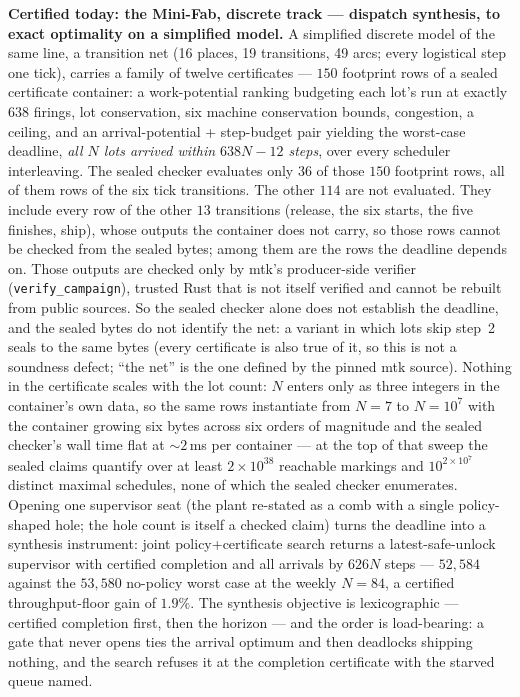 \textbf{Certified today: the Mini-Fab, discrete track --- dispatch
synthesis, to exact optimality on a simplified model.} A simplified
discrete model of the same line, a transition net (16 places, 19 transitions, 49 arcs; every logistical
step one tick), carries a family of twelve certificates --- $150$
footprint rows of a sealed certificate container: a work-potential
ranking budgeting each lot's run at exactly $638$ firings, lot
conservation, six machine conservation bounds, congestion, a
ceiling, and an arrival-potential + step-budget pair yielding the
worst-case deadline, \emph{all $N$ lots arrived within $638N - 12$
steps}, over every scheduler interleaving. The sealed checker
evaluates only $36$ of those $150$ footprint rows, all of them rows
of the six tick transitions. The other $114$ are not evaluated. They
include every row of the other $13$ transitions (release, the six
starts, the five finishes, ship), whose outputs the container does
not carry, so those rows cannot be checked from the sealed bytes;
among them are the rows the deadline depends on.
Those outputs are checked only by mtk's producer-side verifier
(\texttt{verify\_campaign}), trusted Rust that is not itself verified
and cannot be rebuilt from public sources. So the sealed checker
alone does not establish the deadline, and the sealed bytes do not
identify the net: a variant in which lots skip step~2 seals to the
same bytes (every certificate is also true of it, so this is not a
soundness defect; ``the net'' is the one defined by the pinned mtk
source). Nothing in the
certificate scales with the lot count: $N$ enters only as three
integers in the container's own data, so the same rows instantiate
from $N = 7$ to $N = 10^{7}$ with the container growing six bytes
across six orders of magnitude and the sealed checker's wall time flat at
$\sim\!2$\,ms per container --- at the top of that sweep the sealed claims
quantify over at least $2\times10^{38}$ reachable markings and
$10^{2\times10^{7}}$ distinct maximal schedules, none of which the sealed
checker enumerates. Opening one supervisor seat (the plant re-stated as
a comb with a single policy-shaped hole; the hole count is itself a
checked claim) turns the deadline into a synthesis instrument: joint
policy+certificate search returns a latest-safe-unlock supervisor
with certified completion and all arrivals by $626N$ steps ---
$52{,}584$ against the $53{,}580$ no-policy worst case at the weekly
$N = 84$, a certified throughput-floor gain of $1.9\%$. The
synthesis objective is lexicographic --- certified completion first,
then the horizon --- and the order is load-bearing: a gate that
never opens ties the arrival optimum and then deadlocks shipping
nothing, and the search refuses it at the completion certificate
with the starved queue named.

